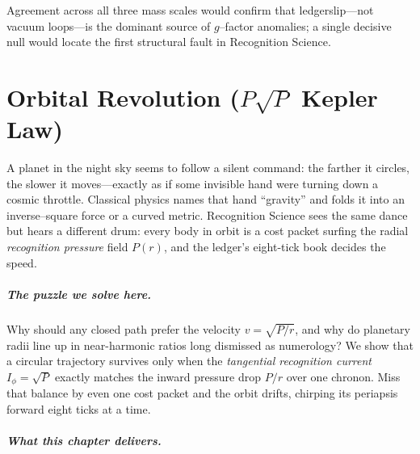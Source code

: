 \documentclass[11pt,oneside]{book}
\begin{document}
Agreement across all three mass scales would confirm that
ledgerslip—not vacuum loops—is the dominant source of $g$–factor
anomalies; a single decisive null would locate the first structural
fault in Recognition Science.


\chapter{Orbital Revolution (\texorpdfstring{$P\sqrt{P}$}{P√P} Kepler Law)}
\label{sec:orbital-rev-intro}

A planet in the night sky seems to follow a silent command:
the farther it circles, the slower it moves—exactly as if some
invisible hand were turning down a cosmic throttle.
Classical physics names that hand “gravity” and
folds it into an inverse–square force or a curved metric.
Recognition Science sees the same dance but hears a different drum:
every body in orbit is a cost packet surfing the radial
\emph{recognition pressure} field \(P(r)\),
and the ledger’s eight-tick book decides the speed.

\paragraph{The puzzle we solve here.}
Why should any closed path prefer the velocity
\(v=\sqrt{P/r}\), and why do planetary radii line up in near-harmonic
ratios long dismissed as numerology?
We show that a circular trajectory survives only when
the \emph{tangential recognition current}
\(I_{\!\phi}=\sqrt{P}\) exactly matches the inward
pressure drop \(P/r\) over one chronon.
Miss that balance by even one cost packet and the orbit drifts,
chirping its periapsis forward eight ticks at a time.

\paragraph{What this chapter delivers.}
\end{document}

